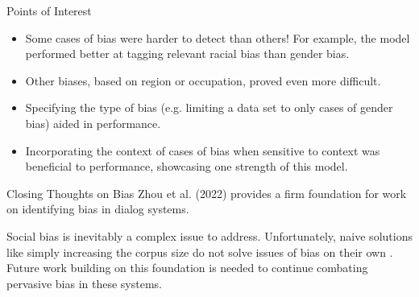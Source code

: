 \documentclass[10pt]{beamer}
\begin{document}
\begin{frame}
Points of Interest
\begin{itemize}
    \item Some cases of bias were harder to detect than others! For example, the model performed better at tagging relevant racial bias than gender bias.
    \item Other biases, based on region or occupation, proved even more difficult.
    \item Specifying the type of bias (e.g. limiting a data set to only cases of gender bias) aided in performance. 
    \item Incorporating the context of cases of bias when sensitive to context was beneficial to performance, showcasing one strength of this model.
\end{itemize}

\end{frame}

\begin{frame}{Closing Thoughts on Bias}
Zhou et al. (2022) provides a firm foundation for work on identifying bias in dialog systems. 

Social bias is inevitably a complex issue to address. Unfortunately, naive solutions like simply increasing the corpus size do not solve issues of bias on their own \cite{bias2}. Future work building on this foundation is needed to continue combating pervasive bias in these systems.
\end{frame}
\end{document}
